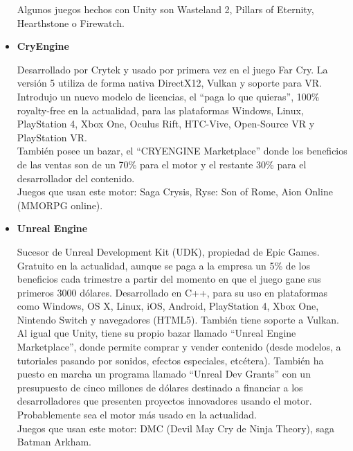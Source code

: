 \begin{itemize}
\quad Algunos juegos hechos con Unity son Wasteland 2, Pillars of Eternity, Hearthstone o Firewatch.\\

\item{\textbf{CryEngine}}

\quad Desarrollado por Crytek y usado por primera vez en el juego Far Cry. La versión 5 utiliza de forma nativa DirectX12, Vulkan y soporte para VR.\\

\quad Introdujo un nuevo modelo de licencias, el “paga lo que quieras”, 100\% royalty-free en la actualidad, para las plataformas Windows, Linux, PlayStation 4, Xbox One, Oculus Rift, HTC-Vive, Open-Source VR y PlayStation VR.\\

\quad También posee un bazar, el “CRYENGINE Marketplace” donde los beneficios de las ventas son de un 70\% para el motor y el restante 30\% para el desarrollador del contenido.\\

\quad Juegos que usan este motor: Saga Crysis, Ryse: Son of Rome, Aion Online (MMORPG online).\\

\item{\textbf{Unreal Engine}}

\quad Sucesor de Unreal Development Kit (UDK), propiedad de Epic Games. Gratuito en la actualidad, aunque se paga a la empresa un 5\% de los beneficios cada trimestre a partir del momento en que el juego gane sus primeros 3000 dólares. Desarrollado en C++, para su uso en plataformas como Windows, OS X, Linux, iOS, Android, PlayStation 4, Xbox One, Nintendo Switch y navegadores (HTML5). También tiene soporte a Vulkan.\\

\quad Al igual que Unity, tiene su propio bazar llamado “Unreal Engine Marketplace”, donde permite comprar y vender contenido (desde modelos, a tutoriales pasando por sonidos, efectos especiales, etcétera). También ha puesto en marcha un programa llamado “Unreal Dev Grants” con un presupuesto de cinco millones de dólares destinado a financiar a los desarrolladores que presenten proyectos innovadores usando el motor. Probablemente sea el motor más usado en la actualidad.\\

\quad Juegos que usan este motor: DMC (Devil May Cry de Ninja Theory), saga Batman Arkham.\\


\end{itemize}
